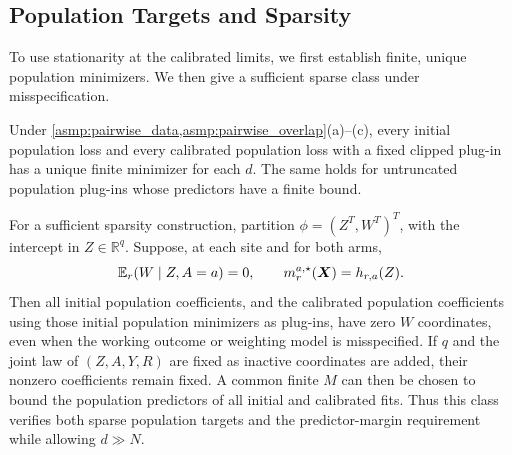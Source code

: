 \documentclass[12pt]{article}
\begin{document}
\subsection{Population Targets and Sparsity}\label{supp:population_targets}
To use stationarity at the calibrated limits, we first establish finite, unique population minimizers. We then give a sufficient sparse class under misspecification.
\begin{proposition}\label{prop:sparse_population_targets}
Under \cref{asmp:pairwise_data,asmp:pairwise_overlap}(a)--(c), every initial population loss and every calibrated population loss with a fixed clipped plug-in has a unique finite minimizer for each $d$. The same holds for untruncated population plug-ins whose predictors have a finite bound.

For a sufficient sparsity construction, partition $\phi=(Z^T,W^T)^T$, with the intercept in $Z\in\mathbb R^q$. Suppose, at each site and for both arms,
\begin{equation}\label{eq:inactive_centering}
\mathbb{E}_r(W\mid Z,A=a)=0,
\qquad m_r^{a,\star}(\boldsymbol X)=h_{r,a}(Z).
\end{equation}
Then all initial population coefficients, and the calibrated population coefficients using those initial population minimizers as plug-ins, have zero $W$ coordinates, even when the working outcome or weighting model is misspecified. If $q$ and the joint law of $(Z,A,Y,R)$ are fixed as inactive coordinates are added, their nonzero coefficients remain fixed. A common finite $M$ can then be chosen to bound the population predictors of all initial and calibrated fits. Thus this class verifies both sparse population targets and the predictor-margin requirement while allowing $d\gg N$.
\end{proposition}
\end{document}
